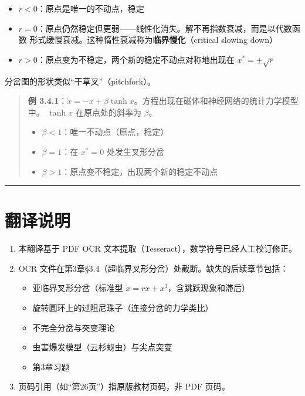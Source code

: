 \documentclass[12pt,a4paper]{article}
\begin{document}
\begin{itemize}[nosep]
  \item $r < 0$：原点是唯一的不动点，稳定
  \item $r = 0$：原点仍然稳定但更弱——线性化消失。解不再指数衰减，而是以代数函数
        形式缓慢衰减。这种惰性衰减称为\textbf{临界慢化}（critical slowing down）
  \item $r > 0$：原点变为不稳定，两个新的稳定不动点对称地出现在 $x^* = \pm\sqrt{r}$
\end{itemize}

分岔图的形状类似``干草叉''（pitchfork）。

\begin{quote}
\textbf{例 3.4.1}：$\dot{x} = -x + \beta\tanh x$。方程出现在磁体和神经网络的统计力学模型中。
$\tanh x$ 在原点处的斜率为 $\beta$。
\begin{itemize}[nosep]
  \item $\beta < 1$：唯一不动点（原点，稳定）
  \item $\beta = 1$：在 $x^* = 0$ 处发生叉形分岔
  \item $\beta > 1$：原点变不稳定，出现两个新的稳定不动点
\end{itemize}
\end{quote}

\vspace{12pt}
\hrule
\vspace{12pt}

\section*{翻译说明}

\begin{enumerate}[nosep]
  \item 本翻译基于 PDF OCR 文本提取（Tesseract），数学符号已经人工校订修正。
  \item OCR 文件在第3章\S3.4（超临界叉形分岔）处截断。缺失的后续章节包括：
        \begin{itemize}[nosep]
          \item 亚临界叉形分岔（标准型 $\dot{x} = rx + x^3$，含跳跃现象和滞后）
          \item 旋转圆环上的过阻尼珠子（连接分岔的力学类比）
          \item 不完全分岔与突变理论
          \item 虫害爆发模型（云杉蚜虫）与尖点突变
          \item 第3章习题
        \end{itemize}
  \item 页码引用（如``第26页''）指原版教材页码，非 PDF 页码。
\end{enumerate}
\end{document}
